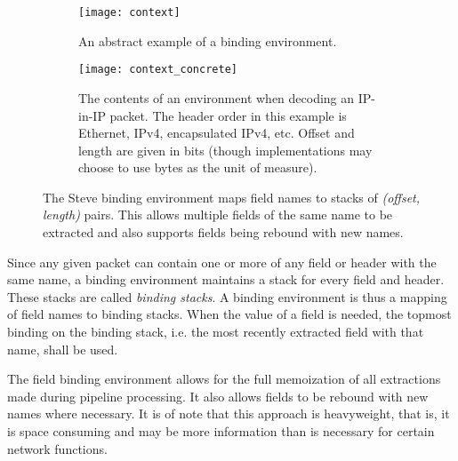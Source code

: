 \begin{figure}[ht]
\begin{subfigure}[t]{.45\textwidth}
  \centering
  \texttt{[image: context]}
  \caption{An abstract example of a binding environment.}
  \label{fg:context1}
\end{subfigure}
\hfill
\begin{subfigure}[t]{.45\textwidth}
  \centering
  \texttt{[image: context\_concrete]}
  \caption{The contents of an environment when decoding an IP-in-IP packet. The header order in this example is Ethernet, IPv4, encapsulated IPv4, etc. Offset and length are given in bits (though implementations
  may choose to use bytes as the unit of measure).}
  \label{fg:context2}
\end{subfigure}


\caption{The Steve binding environment maps field names to stacks of
  \emph{(offset, length)} pairs. This allows multiple fields of the same
  name to be extracted and also supports fields being rebound with new names.}
\label{fg:ContextEnv}
\end{figure}

Since any given packet can contain one or more of any field or header with the
same name, a binding environment maintains a stack for every field and header.
These stacks are called \emph{binding stacks}. A binding environment is thus a 
mapping of field names to binding stacks. 
When the value of a field is needed, 
the topmost binding on the binding stack, i.e. the
most recently extracted field with that name, shall be used.

The field binding environment allows for the full memoization of all
extractions made during pipeline processing. It also allows fields to
be rebound with new names where necessary. It is of note that this
approach is heavyweight, that is, it is space consuming and may be
more information than is necessary for certain network functions.

